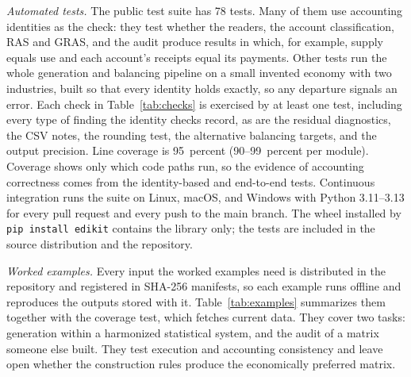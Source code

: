 \documentclass[11pt,a4paper]{article}
\begin{document}
\emph{Automated tests.} The public test suite has 78 tests. Many of them
use accounting identities as the check: they test whether the readers,
the account classification, RAS and GRAS, and the audit produce results
in which, for example, supply equals use and each account's receipts
equal its payments. Other tests run the whole generation and balancing
pipeline on a small invented economy with two industries, built so that
every identity holds exactly, so any departure signals an error. Each check in Table~\ref{tab:checks} is exercised by at least one
test, including every type of finding the identity checks record, as are
the residual diagnostics, the CSV notes, the rounding test, the
alternative balancing targets, and the output precision. Line coverage is
95~percent (90--99~percent per module). Coverage shows only which code
paths run, so the evidence of accounting correctness comes from the
identity-based and end-to-end tests. Continuous
integration runs the suite on Linux, macOS, and Windows with Python
3.11--3.13 for every pull request and every push to the main branch. The
wheel installed by \texttt{pip install edikit} contains the library only;
the tests are included in the source distribution and the repository.

\emph{Worked examples.} Every input the worked examples need is
distributed in the repository and registered in SHA-256 manifests, so
each example runs offline and reproduces the outputs stored with it. Table~\ref{tab:examples} summarizes them
together with the coverage test, which fetches current data. They cover
two tasks: generation within a harmonized statistical system, and the
audit of a matrix someone else built. They test execution and accounting
consistency and leave open whether the construction rules produce the
economically preferred matrix.
\end{document}
